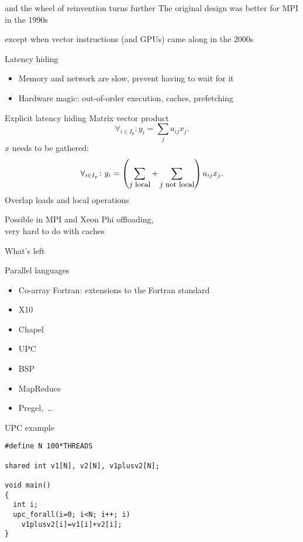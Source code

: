 \begin{numberedframe}{and the wheel of reinvention turns further}
  The original design was better for MPI in the 1990s

  except when vector instructions (and GPUs) came along in the 2000s
\end{numberedframe}

\begin{numberedframe}{Latency hiding}
  \begin{itemize}
  \item Memory and network are slow, prevent having to wait for it
  \item Hardware magic: out-of-order execution, caches, prefetching
  \end{itemize}
\end{numberedframe}

\begin{numberedframe}{Explicit latency hiding}
Matrix vector product
\[ \forall_{i\in I_p}\colon y_i=\sum_j a_{ij}x_j. \]
$x$ needs to be gathered:
\[ \forall_{i\in I_p}\colon y_i=
  \left(\sum_{\mbox{\small $j$ local}}
    +\sum_{\mbox{\small $j$ not local}} \right) a_{ij}x_j. 
\]
Overlap loads and local operations

Possible in MPI and Xeon Phi offloading,\\
very hard to do with caches  
\end{numberedframe}

 {What's left}

\begin{numberedframe}{Parallel languages}
  \begin{itemize}
  \item Co-array Fortran: extensions to the Fortran standard
  \item X10
  \item Chapel
  \item UPC
  \item BSP
  \item MapReduce
  \item Pregel,~\ldots
  \end{itemize}
\end{numberedframe}

\begin{numberedframe}{UPC example}
\begin{lstlisting}
#define N 100*THREADS

shared int v1[N], v2[N], v1plusv2[N];

void main()
{
  int i;
  upc_forall(i=0; i<N; i++; i)
    v1plusv2[i]=v1[i]+v2[i];
}
\end{lstlisting}
\end{numberedframe}

